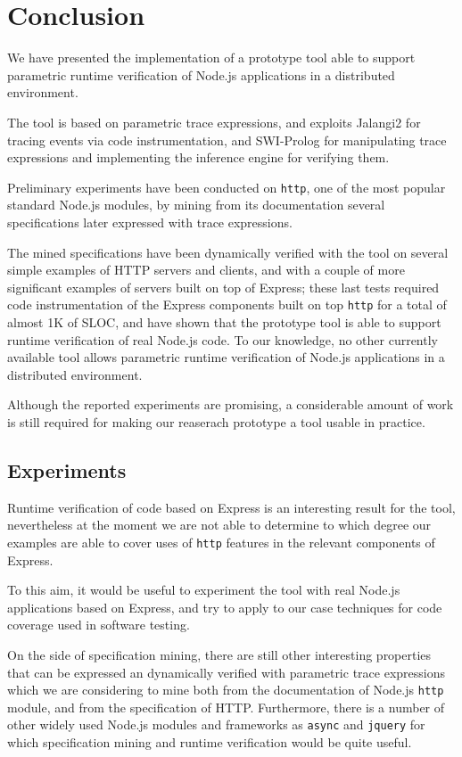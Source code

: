 \section{Conclusion}
\label{sec:conclu}

We have presented the implementation of a prototype tool able to support
parametric runtime verification of Node.js applications in a distributed environment.

The tool is based on parametric trace expressions, and exploits Jalangi2 for tracing events via code instrumentation, and SWI-Prolog for
manipulating trace expressions and implementing the inference engine for verifying them.

Preliminary experiments have been conducted on \lstinline{http}, one of the most popular standard Node.js modules,
by mining from its documentation several specifications later expressed with trace expressions.

The mined specifications have been dynamically verified with the tool on several simple examples of HTTP servers and clients,
and with a couple of more significant examples of servers built on top of Express; these last tests required code instrumentation of the Express components
built on top \lstinline{http} for a total of almost 1K of SLOC, and have shown that the prototype tool is able to support
runtime verification of real Node.js code.
To our knowledge, no other currently available tool allows parametric runtime verification of Node.js applications in a distributed environment.

Although the reported experiments are promising, a considerable amount of work is still required for making our reaserach prototype a
tool usable in practice.

\subsection{Experiments}
Runtime verification of code based on Express is an interesting result for the tool, nevertheless
at the moment we are not able to determine to which degree our examples are able to
cover uses of \lstinline{http} features in the relevant components of Express.

To this aim, it would be useful to experiment the tool with real Node.js applications
based on Express, and try to apply to our case techniques for code coverage \cite{artho2005combining} used in software testing.

On the side of specification mining, there are still other interesting properties that can be expressed an dynamically
verified with parametric trace expressions which we are considering to mine both from the documentation of Node.js
\lstinline{http} module, and from the specification of HTTP. Furthermore, there is a number of other widely used Node.js
modules and frameworks as \lstinline{async} and \lstinline{jquery} for which specification mining and runtime
verification would be quite useful.

